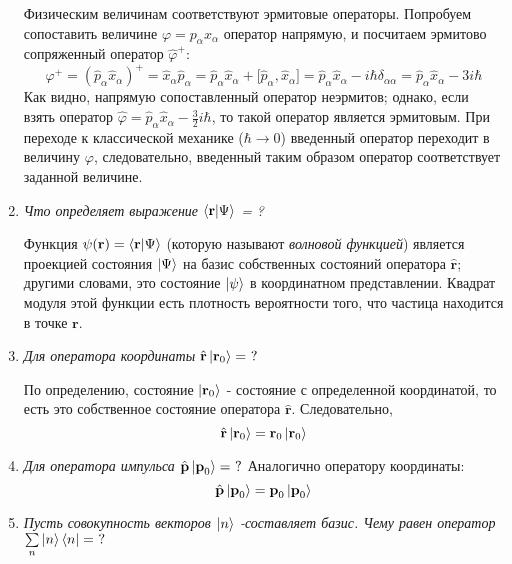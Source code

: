 \documentclass{article}
\begin{document}
\begin{enumerate}
	Физическим величинам соответствуют эрмитовые операторы. Попробуем сопоставить величине $\varphi = p_\alpha x_\alpha$ оператор напрямую, и посчитаем эрмитово сопряженный оператор $\hat{\varphi}^+$:
	\begin{equation}
		\varphi^+ = (\hat{p}_\alpha \hat{x}_\alpha)^+ = \hat{x}_\alpha \hat{p}_\alpha = \hat{p}_\alpha \hat{x}_\alpha + \big[\hat{p}_\alpha, \hat{x}_\alpha \big] = \hat{p}_\alpha \hat{x}_\alpha - i\hbar \delta_{\alpha\alpha} = \hat{p}_\alpha \hat{x}_\alpha - 3i\hbar
	\end{equation}
	Как видно, напрямую сопоставленный оператор неэрмитов; однако, если взять оператор $\hat{\varphi} = \hat{p}_\alpha \hat{x}_\alpha - \frac{3}{2}i\hbar$, то такой оператор является эрмитовым. При переходе к классической механике ($\hbar \to 0$) введенный оператор переходит в величину $\varphi$, следовательно, введенный таким образом оператор соответствует заданной величине.
	
	\item \textit{Что определяет выражение }$\braket{\textbf{r}|\Psi}$\textit{ = ?}
	
	Функция $\psi(\textbf{r}) = \braket{\textbf{r}|\Psi}$ (которую называют \textit{волновой функцией}) является проекцией состояния $\ket{\Psi}$ на базис собственных состояний оператора $\hat{\textbf{r}}$; другими словами, это состояние $\ket{\psi}$ в координатном представлении. Квадрат модуля этой функции есть плотность вероятности того, что частица находится в точке $\textbf{r}$.
	
	\item \textit{Для оператора координаты $\hat{\textbf{r} } \ket{\textbf{r}_0} = \ ?$}
	
	По определению, состояние $\ket{\textbf{r}_0}$ - состояние с определенной координатой, то есть это собственное состояние оператора $\hat{\textbf{r}}$. Следовательно,
	\begin{equation}
		\hat{\textbf{r}}\ket{\textbf{r}_0} = \textbf{r}_0 \ket{\textbf{r}_0}
	\end{equation}
	
	\item \textit{Для оператора импульса  $\hat{\textbf{p} } \ket{\textbf{p}_0} = \ ?$}
	Аналогично оператору координаты:
	\begin{equation}
		\hat{\textbf{p}}\ket{\textbf{p}_0} = \textbf{p}_0 \ket{\textbf{p}_0}
	\end{equation}
	
	\item \textit{Пусть совокупность векторов $\ket{n}$ -составляет базис. Чему равен оператор $\sum\limits_n \ket{n}\bra{n} = \ ?$}
	

\end{enumerate}
\end{document}
